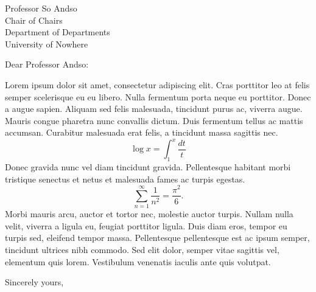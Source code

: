 \documentclass[letterpaper]{mscsletter}
\begin{document}
\begin{letter}{
Professor So Andso\\
Chair of Chairs\\
Department of Departments\\
University of Nowhere\\
}

\opening{Dear Professor Andso:}

Lorem ipsum dolor sit amet, consectetur adipiscing elit. Cras
porttitor leo at felis semper scelerisque eu eu libero. Nulla
fermentum porta neque eu porttitor. Donec a augue sapien. Aliquam sed
felis malesuada, tincidunt purus ac, viverra augue. Mauris congue
pharetra nunc convallis dictum. Duis fermentum tellus ac mattis
accumsan. Curabitur malesuada erat felis, a tincidunt massa sagittis
nec.
$$\log x = \int_1^x\frac{dt}{t}$$
Donec gravida nunc vel diam tincidunt gravida. Pellentesque habitant
morbi tristique senectus et netus et malesuada fames ac turpis
egestas.
$$\sum_{n=1}^\infty\frac{1}{n^2} = \frac{\pi^2}{6}.$$
Morbi mauris arcu, auctor et tortor nec, molestie auctor
turpis. Nullam nulla velit, viverra a ligula eu, feugiat porttitor
ligula. Duis diam eros, tempor eu turpis sed, eleifend tempor
massa. Pellentesque pellentesque est ac ipsum semper, tincidunt
ultrices nibh commodo. Sed elit dolor, semper vitae sagittis vel,
elementum quis lorem. Vestibulum venenatis iaculis ante quis
volutpat.

\closing{Sincerely yours,}

\end{letter}
\end{document}
